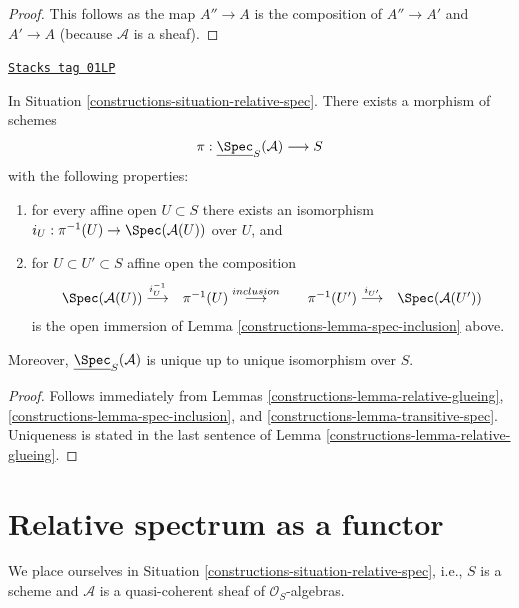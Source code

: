 \begin{proof}
This follows as the map $A'' \to A$ is the composition of $A'' \to A'$ and
$A' \to A$ (because $\mathcal{A}$ is a sheaf).
\end{proof}

\begin{lemma}
\label{constructions-lemma-glue-relative-spec}
\href{https://stacks.math.columbia.edu/tag/01LP}{\texttt{Stacks tag 01LP}}

In Situation \ref{constructions-situation-relative-spec}.
There exists a morphism of schemes
$$
\pi : \underline{\Spec}_S(\mathcal{A}) \longrightarrow S
$$
with the following properties:
\begin{enumerate}
\item for every affine open $U \subset S$ there exists an isomorphism
$i_U : \pi^{-1}(U) \to \Spec(\mathcal{A}(U))$ over $U$, and
\item for $U \subset U' \subset S$ affine open the composition
$$
\begin{array}{ccccc}\Spec(\mathcal{A}(U)) \overset{i_U^{-1}}{\longrightarrow} & \pi^{-1}(U) \overset{inclusion}{\longrightarrow} &  & \pi^{-1}(U') \overset{i_{U'}}{\longrightarrow} & \Spec(\mathcal{A}(U'))\end{array}
$$
is the open immersion of Lemma \ref{constructions-lemma-spec-inclusion} above.
\end{enumerate}
Moreover, $\underline{\Spec}_S(\mathcal{A})$
is unique up to unique isomorphism over $S$.
\end{lemma}

\begin{proof}

Follows immediately from
Lemmas \ref{constructions-lemma-relative-glueing},
\ref{constructions-lemma-spec-inclusion}, and
\ref{constructions-lemma-transitive-spec}.
Uniqueness is stated in the last sentence of
Lemma \ref{constructions-lemma-relative-glueing}.
\end{proof}

\section{Relative spectrum as a functor}
\label{constructions-section-spec}
We place ourselves in Situation \ref{constructions-situation-relative-spec}, i.e.,
$S$ is a scheme and $\mathcal{A}$ is a quasi-coherent sheaf of
$\mathcal{O}_S$-algebras.

